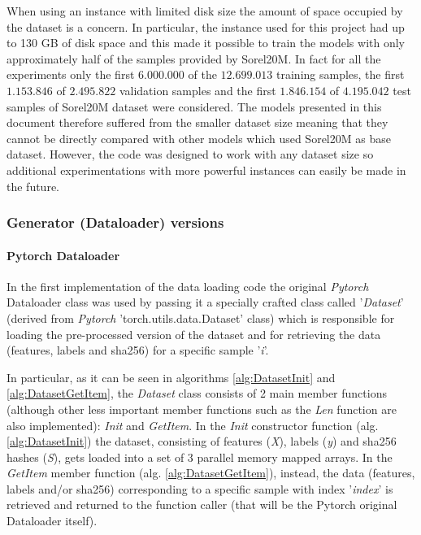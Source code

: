 \documentclass[pdfa%
,cucitura%
]{toptesi}
\begin{document}
When using an instance with limited disk size the amount of space occupied by the dataset is a concern. In particular, the instance used for this project had up to 130 GB of disk space and this made it possible to train the models with only approximately half of the samples provided by Sorel20M. In fact for all the experiments only the first $6.000.000$ of the $12.699.013$ training samples, the first $1.153.846$ of $2.495.822$ validation samples and the first $1.846.154$ of $4.195.042$ test samples of Sorel20M dataset were considered. The models presented in this document therefore suffered from the smaller dataset size meaning that they cannot be directly compared with other models which used Sorel20M as base dataset. However, the code was designed to work with any dataset size so additional experimentations with more powerful instances can easily be made in the future.

\subsubsection{Generator (Dataloader) versions}
\paragraph{Pytorch Dataloader}
In the first implementation of the data loading code the original \textit{Pytorch} Dataloader class was used by passing it a specially crafted class called '\textit{Dataset}' (derived from \textit{Pytorch} 'torch.utils.data.Dataset' class) which is responsible for loading the pre-processed version of the dataset and for retrieving the data (features, labels and sha256) for a specific sample '\textit{i}'.

In particular, as it can be seen in algorithms \ref{alg:DatasetInit} and \ref{alg:DatasetGetItem}, the \textit{Dataset} class consists of 2 main member functions (although other less important member functions such as the \textit{Len} function are also implemented): \textit{Init} and \textit{GetItem}. In the \textit{Init} constructor function (alg. \ref{alg:DatasetInit}) the dataset, consisting of features (\textit{X}), labels (\textit{y}) and sha256 hashes (\textit{S}), gets loaded into a set of 3 parallel memory mapped arrays. In the \textit{GetItem} member function (alg. \ref{alg:DatasetGetItem}), instead, the data (features, labels and/or sha256) corresponding to a specific sample with index '\textit{index}' is retrieved and returned to the function caller (that will be the Pytorch original Dataloader itself).
\end{document}
